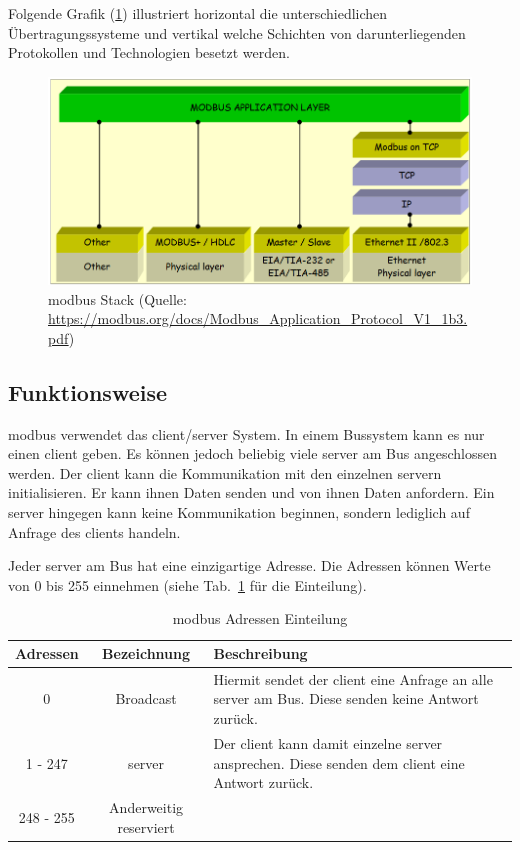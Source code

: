 Folgende Grafik (\ref{fig:modbus_stack}) illustriert horizontal die unterschiedlichen Übertragungssysteme und vertikal welche Schichten von darunterliegenden Protokollen und Technologien besetzt werden.
\begin{figure}[H]
	\centering
	\includegraphics[width=1.0\linewidth]{Bilder/Modbus_layers}
	\caption{\gls{modbus} Stack (Quelle: \url{https://modbus.org/docs/Modbus_Application_Protocol_V1_1b3.pdf})}
	\label{fig:modbus_stack}
\end{figure}

\subsection{Funktionsweise} \label{modbus_funktionsweise}
\gls{modbus} verwendet das \gls{client}/\gls{server} System. In einem Bussystem kann es nur einen \gls{client} geben. Es können jedoch beliebig viele \gls{server} am Bus angeschlossen werden. Der \gls{client} kann die Kommunikation mit den einzelnen \gls{server}n initialisieren. Er kann ihnen Daten senden und von ihnen Daten anfordern. Ein \gls{server} hingegen kann keine Kommunikation beginnen, sondern lediglich auf Anfrage des \gls{client}s handeln.

Jeder \gls{server} am Bus hat eine einzigartige Adresse. Die Adressen können Werte von 0 bis 255 einnehmen (siehe Tab.~\ref{tab:modbus_adressen} für die Einteilung). 
\begin{table}[H]
	\caption{\gls{modbus} Adressen Einteilung \label{tab:modbus_adressen}}
	\begin{tabularx}{\textwidth}{@{}c|c|X@{}}
		\toprule
		\textbf{Adressen} & \textbf{Bezeichnung} & \textbf{Beschreibung} \\
		\midrule
		0 & Broadcast & Hiermit sendet der \gls{client} eine Anfrage an alle \gls{server} am Bus. Diese senden keine Antwort zurück. \\
		1 - 247 & \gls{server} & Der \gls{client} kann damit einzelne \gls{server} ansprechen. Diese senden dem \gls{client} eine Antwort zurück. \\
		248 - 255 & Anderweitig reserviert & \\
		\bottomrule
	\end{tabularx}
\end{table}

